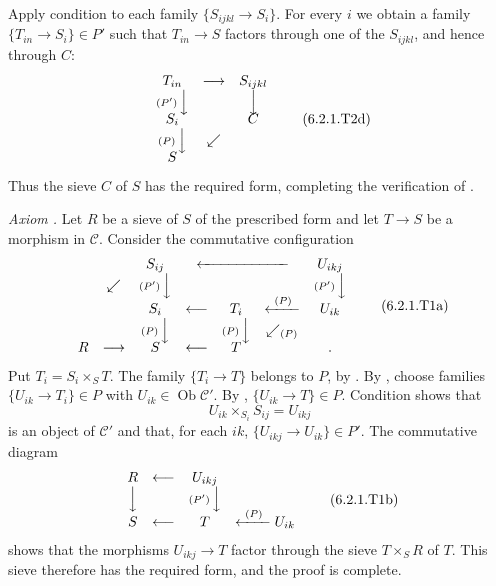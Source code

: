 Apply condition  to each family \(\{S_{ijkl}\to S_i\}\). For every \(i\)
we obtain a family \(\{T_{in}\to S_i\}\in P'\) such that \(T_{in}\to S\)
factors through one of the \(S_{ijkl}\), and hence through \(C\):
\[
\begin{array}{ccccc}
  T_{in} & \longrightarrow & S_{ijkl}\\
  \scriptstyle(P')\,\Big\downarrow & & \Big\downarrow\\[-0.25em]
  S_i & & C\\
  \scriptstyle(P)\,\Big\downarrow & \swarrow &\\[-0.25em]
  S & &
\end{array}
\tag{6.2.1.T2d}\label{sga3:iv:proposition:6:2:1:eq:6:2:1:t2d:01}
\]
Thus the sieve \(C\) of \(S\) has the required form, completing the
verification of .

\smallskip
\noindent\textit{Axiom .}
Let \(R\) be a sieve of \(S\) of the prescribed form and let \(T\to S\) be
a morphism in \(\mathscr C\). Consider the commutative configuration
\[
\begin{array}{ccccccc}
  & & S_{ij} & \multicolumn{3}{c}{\xleftarrow{\hspace{6em}}} & U_{ikj}\\
  & \swarrow & \scriptstyle(P')\,\Big\downarrow & & & &
    \scriptstyle(P')\,\Big\downarrow\\[-0.25em]
  & & S_i & \longleftarrow & T_i & \xleftarrow{\ (P)\ } & U_{ik}\\
  & & \scriptstyle(P)\,\Big\downarrow & &
    \scriptstyle(P)\,\Big\downarrow & \swarrow_{\scriptstyle(P)} &\\[-0.25em]
  R & \longrightarrow & S & \longleftarrow & T & & .
\end{array}
\tag{6.2.1.T1a}\label{sga3:iv:proposition:6:2:1:eq:6:2:1:t1a:01}
\]
Put \(T_i=S_i\times_ST\). The family \(\{T_i\to T\}\) belongs to \(P\),
by . By , choose families \(\{U_{ik}\to T_i\}\in P\) with
\(U_{ik}\in\operatorname{Ob}\mathscr C'\). By ,
\(\{U_{ik}\to T\}\in P\). Condition  shows that
\[
  U_{ik}\times_{S_i}S_{ij}=U_{ikj}
\]
is an object of \(\mathscr C'\) and that, for each \(ik\),
\(\{U_{ikj}\to U_{ik}\}\in P'\). The commutative diagram
\[
\begin{array}{ccccc}
  R & \longleftarrow & U_{ikj}\\
  \Big\downarrow & & \scriptstyle(P')\,\Big\downarrow\\[-0.25em]
  S & \longleftarrow & T & \xleftarrow{\ (P)\ } U_{ik}
\end{array}
\tag{6.2.1.T1b}\label{sga3:iv:proposition:6:2:1:eq:6:2:1:t1b:01}
\]
shows that the morphisms \(U_{ikj}\to T\) factor through the sieve
\(T\times_SR\) of \(T\). This sieve therefore has the required form, and
the proof is complete.

